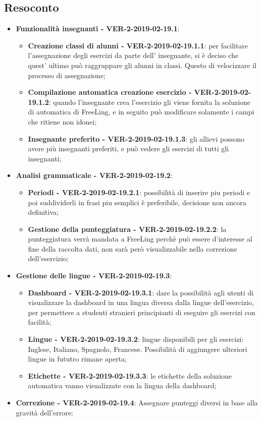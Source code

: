 \documentclass[a4paper, oneside, openany, dvipsnames, table]{article}
\begin{document}
\subsection{Resoconto}
\begin{itemize}
	\item \textbf{Funzionalità insegnanti - VER-2-2019-02-19.1}: 
	\begin{itemize}
		\item \textbf{Creazione classi di alunni - VER-2-2019-02-19.1.1}: per facilitare l'assegnazione degli esercizi da parte dell' insegnante,
		 si è deciso che quest' ultimo può raggruppare gli alunni in classi. Questo di velocizzare
		il processo di assegnazione;
		\item \textbf{Compilazione automatica creazione esercizio - VER-2-2019-02-19.1.2}:
		quando l'insegnante crea l'esercizio gli viene fornita la soluzione di automatica di FreeLing,
		e in seguito può modificare solamente i campi che ritiene non idonei;
		\item \textbf{Insegnante preferito - VER-2-2019-02-19.1.3}: 
		gli allievi possono avere più insegnanti preferiti, e può vedere gli esercizi di tutti gli insegnanti;
	\end{itemize}
	\item \textbf{Analisi grammaticale - VER-2-2019-02-19.2}:
	\begin{itemize}
		\item \textbf{Periodi - VER-2-2019-02-19.2.1}: possibilità di inserire piu periodi e poi suddividerli in frasi piu semplici è preferibile, decisione non ancora definitiva;
		\item \textbf{Gestione della punteggiatura - VER-2-2019-02-19.2.2}: la punteggiatura verrà mandata a FreeLing perchè 
		può essere d'interesse al fine della raccolta dati, non sarà però visualizzabile nella correzione dell'esercizio;
	\end{itemize}
	\item \textbf{Gestione delle lingue - VER-2-2019-02-19.3}: 
	\begin{itemize}
		\item \textbf{Dashboard - VER-2-2019-02-19.3.1}: dare la possibilità agli utenti di visualizzare la dashboard in una lingua diversa dalla lingue dell'esercizio,
		per permettere a studenti stranieri principianti di eseguire gli esercizi con facilità;
		\item \textbf{Lingue - VER-2-2019-02-19.3.2}: lingue disponibili per gli esercizi: 
		Inglese, Italiano, Spagnolo, Francese. Possibilità di aggiungere ulteriori lingue in fututro rimane aperta;
		\item \textbf{Etichette - VER-2-2019-02-19.3.3}: le etichette della soluzione automatica
		vanno visualizzate con la lingua della dashboard;
	\end{itemize}
	\item \textbf{Correzione - VER-2-2019-02-19.4}:
	Assegnare punteggi diversi in base alla gravità dell'errore;
	

\end{itemize}
\end{document}
